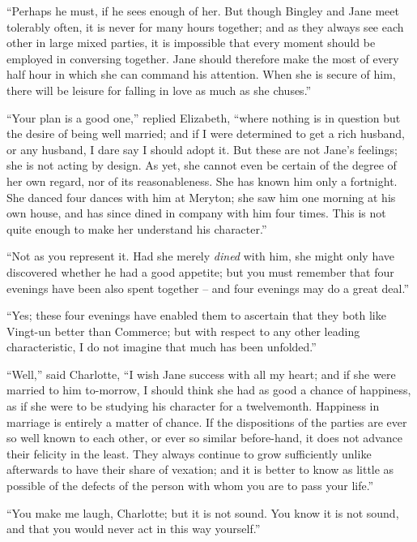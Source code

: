 “Perhaps he must, if he sees enough of her. But
though Bingley and Jane meet tolerably often, it is never
for many hours together; and as they always see each
other in large mixed parties, it is impossible that every
moment should be employed in conversing together.
Jane should therefore make the most of every half hour
in which she can command his attention. When she is
secure of him, there will be leisure for falling in love as
much as she chuses.”

“Your plan is a good one,” replied Elizabeth, “where
nothing is in question but the desire of being well married;
and if I were determined to get a rich husband, or any
husband, I dare say I should adopt it. But these are
not Jane’s feelings; she is not acting by design. As yet,
she cannot even be certain of the degree of her own
regard, nor of its reasonableness. She has known him only
a fortnight. She danced four dances with him at Meryton;
she saw him one morning at his own house, and has since
dined in company with him four times. This is not quite
enough to make her understand his character.”

“Not as you represent it. Had she merely \textit{dined} with
him, she might only have discovered whether he had
a good appetite; but you must remember that four
evenings have been also spent together -- and four evenings
may do a great deal.”

“Yes; these four evenings have enabled them to
ascertain that they both like Vingt-un better than Commerce;
but with respect to any other leading characteristic,
I do not imagine that much has been unfolded.”

“Well,” said Charlotte, “I wish Jane success with all
my heart; and if she were married to him to-morrow,
I should think she had as good a chance of happiness, as
if she were to be studying his character for a twelvemonth.
Happiness in marriage is entirely a matter of
chance. If the dispositions of the parties are ever so
well known to each other, or ever so similar before-hand,
it does not advance their felicity in the least. They
always continue to grow sufficiently unlike afterwards to
have their share of vexation; and it is better to know
as little as possible of the defects of the person with whom
you are to pass your life.”

“You make me laugh, Charlotte; but it is not sound.
You know it is not sound, and that you would never
act in this way yourself.”

